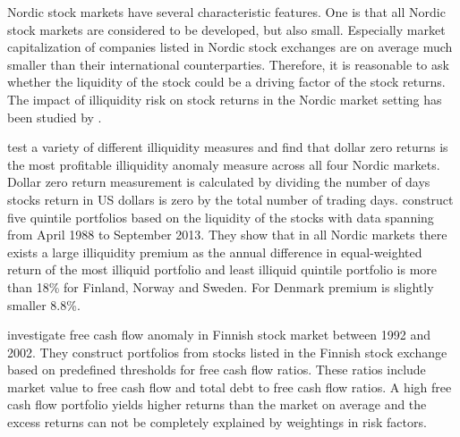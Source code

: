 \documentclass[12pt]{article}
\begin{document}
Nordic stock markets have several characteristic features. One is that all Nordic stock markets are considered to be developed, but also small. Especially market capitalization of companies listed in Nordic stock exchanges are on average much smaller than their international counterparties. Therefore, it is reasonable to ask whether the liquidity of the stock could be a driving factor of the stock returns. The impact of illiquidity risk on stock returns in the Nordic market setting has been studied by \citet{Butt2018}. \par

\citeauthor{Butt2018} test a variety of different illiquidity measures and find that dollar zero returns is the most profitable illiquidity anomaly measure across all four Nordic markets. Dollar zero return measurement is calculated by dividing the number of days stocks return in US dollars is zero by the total number of trading days. \citeauthor{Butt2018} construct five quintile portfolios based on the liquidity of the stocks with data spanning from April 1988 to September 2013. They show that in all Nordic markets there exists a large illiquidity premium as the annual difference in equal-weighted return of the most illiquid portfolio and least illiquid quintile portfolio is more than 18\% for Finland, Norway and Sweden. For Denmark premium is slightly smaller 8.8\%.\footnotemark {} \par

\citet{jokipii2006free} investigate free cash flow anomaly in Finnish stock market between 1992 and 2002. They construct portfolios from stocks listed in the Finnish stock exchange based on predefined thresholds for free cash flow ratios. These ratios include market value to free cash flow and total debt to free cash flow ratios. A high free cash flow portfolio yields higher returns than the market on average and the excess returns can not be completely explained by weightings in \citet{FAMA19933} risk factors. \footnotemark {}  \par
\end{document}
